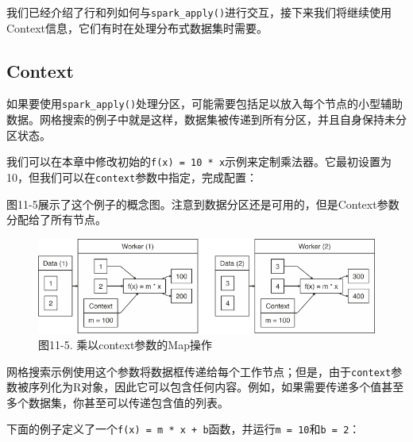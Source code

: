 \documentclass[
]{article}
\newenvironment{Shaded}{\begin{snugshade}}{\end{snugshade}}
\newcommand{\CommentTok}[1]{\textcolor[rgb]{0.56,0.35,0.01}{\textit{#1}}}
\newcommand{\ControlFlowTok}[1]{\textcolor[rgb]{0.13,0.29,0.53}{\textbf{#1}}}
\newcommand{\DataTypeTok}[1]{\textcolor[rgb]{0.13,0.29,0.53}{#1}}
\newcommand{\DecValTok}[1]{\textcolor[rgb]{0.00,0.00,0.81}{#1}}
\newcommand{\KeywordTok}[1]{\textcolor[rgb]{0.13,0.29,0.53}{\textbf{#1}}}
\newcommand{\NormalTok}[1]{#1}
\newcommand{\OperatorTok}[1]{\textcolor[rgb]{0.81,0.36,0.00}{\textbf{#1}}}
\newcommand{\StringTok}[1]{\textcolor[rgb]{0.31,0.60,0.02}{#1}}
\begin{document}
我们已经介绍了行和列如何与\texttt{spark\_apply()}进行交互，接下来我们将继续使用Context信息，它们有时在处理分布式数据集时需要。

\hypertarget{context}{%
\subsection{Context}\label{context}}

如果要使用\texttt{spark\_apply()}处理分区，可能需要包括足以放入每个节点的小型辅助数据。网格搜索的例子中就是这样，数据集被传递到所有分区，并且自身保持未分区状态。

我们可以在本章中修改初始的\texttt{f(x)\ =\ 10\ *\ x}示例来定制乘法器。它最初设置为10，但我们可以在\texttt{context}参数中指定，完成配置：

\begin{Shaded}
\end{Shaded}

图11-5展示了这个例子的概念图。注意到数据分区还是可用的，但是Context参数分配给了所有节点。

\begin{figure}
\centering
\includegraphics{figures/11_5.png}
\caption{图11-5. 乘以context参数的Map操作}
\end{figure}

网格搜索示例使用这个参数将数据框传递给每个工作节点；但是，由于\texttt{context}参数被序列化为R对象，因此它可以包含任何内容。例如，如果需要传递多个值甚至多个数据集，你甚至可以传递包含值的列表。

下面的例子定义了一个\texttt{f(x)\ =\ m\ *\ x\ +\ b}函数，并运行\texttt{m\ =\ 10}和\texttt{b\ =\ 2}：
\end{document}
